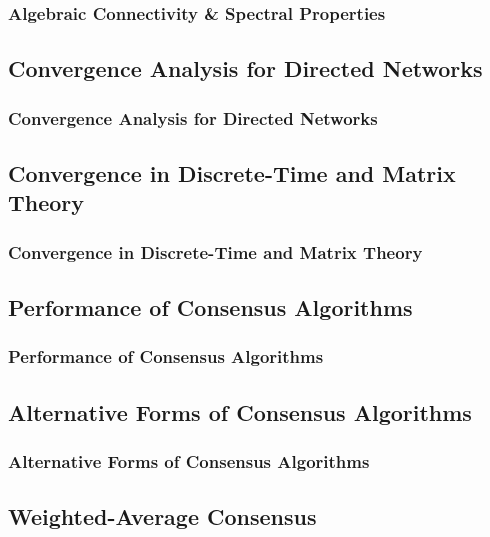 \documentclass{beamer}
\begin{document}
\begin{frame}
\frametitle{Algebraic Connectivity \& Spectral Properties}

\end{frame}

\subsection{Convergence Analysis for Directed Networks}

\begin{frame}
\frametitle{Convergence Analysis for Directed Networks}

\end{frame}

\subsection{Convergence in Discrete-Time and Matrix Theory}

\begin{frame}
\frametitle{Convergence in Discrete-Time and Matrix Theory}

\end{frame}

\subsection{Performance of Consensus Algorithms}

\begin{frame}
\frametitle{Performance of Consensus Algorithms}

\end{frame}

\subsection{Alternative Forms of Consensus Algorithms}

\begin{frame}
\frametitle{Alternative Forms of Consensus Algorithms}

\end{frame}

\subsection{Weighted-Average Consensus}
\end{document}
